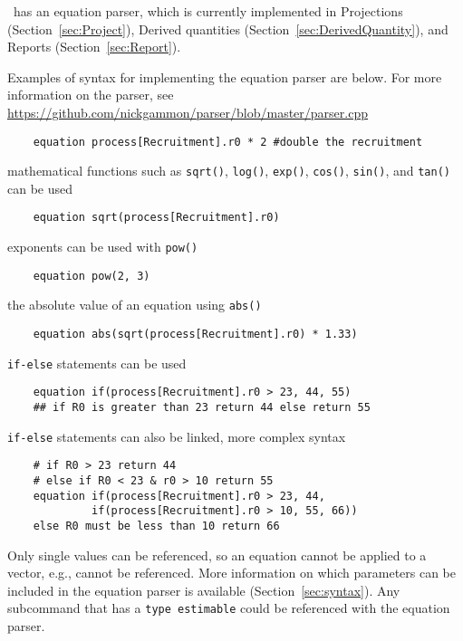 \CNAME\ has an equation parser, which is currently implemented in Projections (Section~\ref{sec:Project}), Derived quantities (Section~\ref{sec:DerivedQuantity}), and Reports (Section~\ref{sec:Report}).

Examples of syntax for implementing the equation parser are below. For more information on the parser, see \url{https://github.com/nickgammon/parser/blob/master/parser.cpp}

{\small{\begin{verbatim}
	equation process[Recruitment].r0 * 2 #double the recruitment
\end{verbatim}}}

mathematical functions such as \texttt{sqrt()}, \texttt{log()},  \texttt{exp()},  \texttt{cos()}, \texttt{sin()}, and \texttt{tan()} can be used

{\small{\begin{verbatim}
	equation sqrt(process[Recruitment].r0)
\end{verbatim}}}

exponents can be used with \texttt{pow()}

{\small{\begin{verbatim}
	equation pow(2, 3)
\end{verbatim}}}

the absolute value of an equation using \texttt{abs()}

{\small{\begin{verbatim}
	equation abs(sqrt(process[Recruitment].r0) * 1.33)
\end{verbatim}}}

\texttt{if-else} statements can be used

{\small{\begin{verbatim}
	equation if(process[Recruitment].r0 > 23, 44, 55)
	## if R0 is greater than 23 return 44 else return 55
\end{verbatim}}}

\texttt{if-else} statements can also be linked, more complex syntax

{\small{\begin{verbatim}
	# if R0 > 23 return 44
	# else if R0 < 23 & r0 > 10 return 55
	equation if(process[Recruitment].r0 > 23, 44,
	         if(process[Recruitment].r0 > 10, 55, 66))
	else R0 must be less than 10 return 66
\end{verbatim}}}

Only single values can be referenced, so an equation cannot be applied to a vector, e.g.,  cannot be referenced. More information on which parameters can be included in the equation parser is available (Section~\ref{sec:syntax}). Any subcommand that has a \texttt{type estimable} could be referenced with the equation parser.


